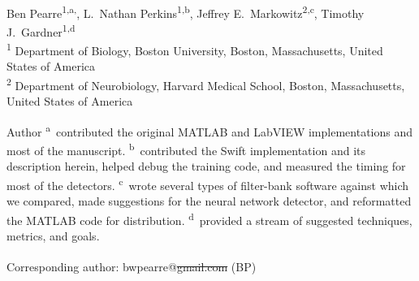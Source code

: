\documentclass[10pt,letterpaper]{article}
\date{}
\providecommand{\DIFaddtex}[1]{{\protect\color{blue}\uwave{#1}}} %
\providecommand{\DIFdeltex}[1]{{\protect\color{red}\sout{#1}}}                      %
\providecommand{\DIFaddbegin}{} %
\providecommand{\DIFaddend}{} %
\providecommand{\DIFdelbegin}{} %
\providecommand{\DIFdelend}{} %
\providecommand{\DIFadd}[1]{\texorpdfstring{\DIFaddtex{#1}}{#1}} %
\providecommand{\DIFdel}[1]{\texorpdfstring{\DIFdeltex{#1}}{}} %
\begin{document}
\vspace*{0.35in}

\begin{flushleft}
{\Large
\textbf{}
}
\newline
\\
Ben Pearre\textsuperscript{1,a,\textcurrency},
L.~Nathan Perkins\textsuperscript{1,b},
Jeffrey E.~Markowitz\textsuperscript{2,c},
Timothy J.~Gardner\textsuperscript{1,d}
\\
\bigskip
\textsuperscript{1} Department of Biology, Boston University, Boston, Massachusetts, United States of America\\
\textsuperscript{2} Department of Neurobiology, Harvard Medical School, Boston, Massachusetts, United States of America
\\
\bigskip

% 
%
Author \textsuperscript{a}~contributed the original MATLAB and LabVIEW implementations and most of the manuscript.
\textsuperscript{b}~contributed the Swift implementation and its description herein, helped debug the training code, and measured the timing for most of the detectors.
\textsuperscript{c}~wrote several types of filter-bank software against which we compared, made suggestions for the neural network detector, and reformatted the MATLAB code for distribution.
\textsuperscript{d}~provided a stream of suggested techniques, metrics, and goals.





\textsuperscript{\textcurrency} Corresponding author: bwpearre@\DIFdelbegin \DIFdel{gmail.com }\DIFdelend \DIFaddbegin \DIFadd{bu.edu }\DIFaddend (BP)

\end{flushleft}
\end{document}
